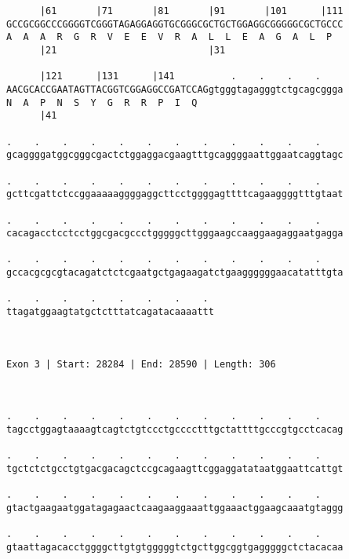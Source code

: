 \documentclass{article}
\begin{document}
\begin{Verbatim}
      |61       |71       |81       |91       |101      |111
GCCGCGGCCCGGGGTCGGGTAGAGGAGGTGCGGGCGCTGCTGGAGGCGGGGGCGCTGCCC
A  A  A  R  G  R  V  E  E  V  R  A  L  L  E  A  G  A  L  P  
      |21                           |31                     
  
      |121      |131      |141          .    .    .    .    
AACGCACCGAATAGTTACGGTCGGAGGCCGATCCAGgtgggtagagggtctgcagcggga
N  A  P  N  S  Y  G  R  R  P  I  Q                          
      |41                                                   
  
.    .    .    .    .    .    .    .    .    .    .    .    
gcaggggatggcgggcgactctggaggacgaagtttgcaggggaattggaatcaggtagc
                                                            
.    .    .    .    .    .    .    .    .    .    .    .    
gcttcgattctccggaaaaaggggaggcttcctggggagttttcagaaggggtttgtaat
                                                            
.    .    .    .    .    .    .    .    .    .    .    .    
cacagacctcctcctggcgacgccctgggggcttgggaagccaaggaagaggaatgagga
                                                            
.    .    .    .    .    .    .    .    .    .    .    .    
gccacgcgcgtacagatctctcgaatgctgagaagatctgaaggggggaacatatttgta
                                                            
.    .    .    .    .    .    .    . 
ttagatggaagtatgctctttatcagatacaaaattt
                                     
                                     
 
Exon 3 | Start: 28284 | End: 28590 | Length: 306



.    .    .    .    .    .    .    .    .    .    .    .    
tagcctggagtaaaagtcagtctgtccctgcccctttgctattttgcccgtgcctcacag
                                                            
.    .    .    .    .    .    .    .    .    .    .    .    
tgctctctgcctgtgacgacagctccgcagaagttcggaggatataatggaattcattgt
                                                            
.    .    .    .    .    .    .    .    .    .    .    .    
gtactgaagaatggatagagaactcaagaaggaaattggaaactggaagcaaatgtaggg
                                                            
.    .    .    .    .    .    .    .    .    .    .    .    
gtaattagacacctggggcttgtgtgggggtctgcttggcggtgagggggctctacacaa
                                                            

\end{Verbatim}
\end{document}
